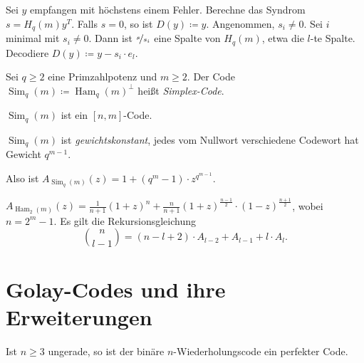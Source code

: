 \documentclass{cheat-sheet}
\DeclareMathOperator{\Ham}{Ham} %
\DeclareMathOperator{\Sim}{Sim} %
\begin{document}
\begin{alg}
  Sei $y$ empfangen mit höchstens einem Fehler.
  Berechne das Syndrom $s = H_q(m)y^T$.
  Falls $s = 0$, so ist $D(y) \coloneqq y$.
  Angenommen, $s_i \neq 0$.
  Sei $i$ minimal mit $s_i \neq 0$.
  Dann ist $\nicefrac{s}{s_i}$ eine Spalte von $H_q(m)$, etwa die $l$-te Spalte.
  Decodiere $D(y) \coloneqq y - s_i \cdot e_l$.
\end{alg}


\begin{defn}
  Sei $q \geq 2$ eine Primzahlpotenz und $m \geq 2$.
  Der Code $\Sim_q(m) \coloneqq \Ham_q(m)^\perp$ heißt \emph{Simplex-Code}.
\end{defn}

\begin{bem}
  $\Sim_q(m)$ ist ein $[n, m]$-Code.
\end{bem}

\begin{satz}
  $\Sim_q(m)$ ist \emph{gewichtskonstant}, \dh{} jedes vom Nullwort verschiedene Codewort hat Gewicht $q^{m-1}$.
\end{satz}

\begin{bem}
  Also ist $A_{\Sim_q(m)}(z) = 1 + (q^m - 1) \cdot z^{q^{m-1}}$.
\end{bem}


\begin{samepage}

\begin{satz}
  $A_{\Ham_2(m)}(z) = \tfrac{1}{n+1} (1+z)^n + \tfrac{n}{n+1} (1+z)^{\tfrac{n-1}{2}} \cdot (1-z)^{\tfrac{n+1}{2}}$,
  wobei $n = 2^m - 1$.
  Es gilt die Rekursionsgleichung
  \[ \binom{n}{l-1} = (n-l+2) \cdot A_{l-2} + A_{l-1} + l \cdot A_l. \]
\end{satz}


\section{Golay-Codes und ihre Erweiterungen}

\end{samepage}

\begin{prop}
  Ist $n \geq 3$ ungerade, so ist der binäre $n$-Wiederholungscode ein perfekter Code.
\end{prop}
\end{document}
